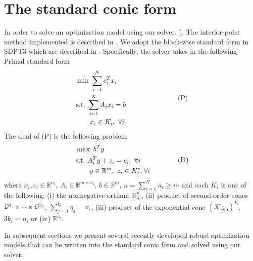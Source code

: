 \documentclass[10pt]{article}
\theoremstyle{definition}
\theoremstyle{plain}
\begin{document}
\section{The standard conic form}
In order to solve an optimization model using our solver. (\cite{Yuan_Gao_note}. The interior-point method implemented is described in \cite{Yuan_Gao_note}. We adopt the block-wise standard form in SDPT3 which are described in \cite{SDPT3_2010}. Specifically, the solver takes in the following Primal standard form
\begin{align*}
\begin{split}
\quad &\min\,\, \sum_{i=1}^N c_i^Tx_i\\
& \text{s.t.}\,\, \sum_{i=1}^N A_i x_i = b \\
&\quad\quad x_i \in K_i,\ \forall i
\end{split} \quad\quad\quad\quad\quad\quad\quad\,\,\, \textnormal{(P)}
\end{align*}
The dual of (P) is the following problem
\begin{align*}
\begin{split}
\quad &\max\,\, b^T y\\
& \text{s.t.}\,\, A_i^T y + z_i = c_i, \ \forall i \\
&\quad\quad y \in \mathbb{R}^m,\ z_i \in K_i^*, \forall i
\end{split}\quad\quad\quad\quad\textnormal{(D)}
\end{align*}
where $x_i, c_i \in \mathbb{R}^{n_i}$, $A_i \in \mathbb{R}^{m\times n_i}$, $b \in \mathbb{R}^m$, $n = \sum_{i=1}^N n_i \geq m$ and each $K_i$ is one of the following: (i) the nonnegative orthant $\mathbb{R}_+^{n_i}$, (ii) product of second-order cones $\mathcal{Q}^{q_1}\times \cdots \times \mathcal{Q}^{q_{k_i}}$, $\sum_{j=1}^{k_i} q_j = n_i$, (iii) product of the exponential cone  $\left(\mathcal{K}_{\exp}\right)^{k_i}$, $3k_i = n_i$ or (iv) $\mathbb{R}^{n_i}$. 

In subsequent sections we present several recently developed robust optimization models that can be written into the standard conic form and solved using our solver. 
\end{document}
